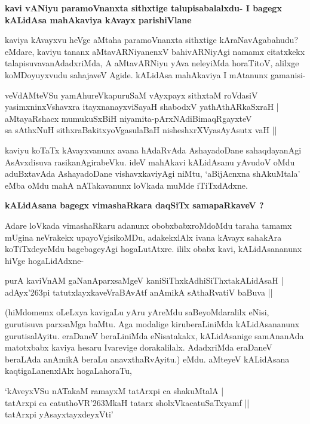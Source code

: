 \newpage
{\noindent
{\large\bf kavi vANiyu paramoVnanxta sithxtige talupisabalalxdu- I bagegx kALidAsa mahAkaviya kAvayx parishiVlane}}\label{page232}
\medskip

\noindent
kaviya kAvayxvu heVge aMtaha paramoVnanxta sithxtige kAraNavAgabahudu? eMdare, kaviyu tananx aMtavARNiyanenxV bahivARNiyAgi namamx citatxkekx talapisuvavanAdadxriMda, A aMtavARNiyu yAva neleyiMda horaTitoV, alilxge koMDoyuyxvudu sahajaveV Agide. kALidAsa mahAkaviya I mAtanunx gamanisi-

\begin{shloka}
veVdAMteVSu yamAhureVkapuruSaM vAyxpayx sithxtaM roVdasiV\\\label{232}
yasimxninxVshavxra itayxnanayxviSayaH shabodxV yathAthARkaSxraH |\\
aMtayaRshacx mumukuSxBiH niyamita-pArxNAdiBimaqRgayxteV \\
sa sAthxNuH sithxraBakitxyoVgasulaBaH nisheshxrXVyasAyAsutx vaH ||
\end{shloka}

kaviyu koTaTx kAvayxvanunx avana hAdaRvAda AshayadoDane sahaqdayanAgi AsAvxdisuva rasikanAgirabeVku. ideV mahAkavi kALidAsanu yAvudoV oMdu aduBxtavAda AshayadoDane vishavxkaviyAgi niMtu, `aBijAcnxna shAkuMtala' eMba oMdu mahA nATakavanunx loVkada muMde iTiTxdAdxne.

{\bigskip
\noindent
{\large\bf kALidAsana bagegx vimashaRkara daqSiTx samapaRkaveV ?}}
\medskip

\noindent
Adare loVkada vimashaRkaru adanunx obobxbabxroMdoMdu taraha tamamx mUgina neVrakekx upayoVgisikoMDu, adakekxlAlx ivana kAvayx sahakAra koTiTxdeyeMdu bagebageyAgi hogaLutAtxre. ililx obabx kavi, kALidAsananunx hiVge hogaLidAdxne-

\begin{shloka}
purA kaviVnAM gaNanAparxsaMgeV kaniSiThxkAdhiSiThxtakALidAsaH |\\\label{233}
adAyx\char'263pi tatutxlayxkaveVraBAvAtf anAmikA sAthaRvatiV baBuva ||
\end{shloka}

\noindent
(hiMdomemx oLeLxya kavigaLu yAru yAreMdu saBeyoMdaralilx eNisi, gurutisuva parxsaMga baMtu. Aga modalige kiruberaLiniMda kALidAsananunx gurutisalAyitu. eraDaneV beraLiniMda eNisatakakx, kALidAsanige samAnanAda matotxbabx kaviya hesaru Ivarevige dorakalilalx. AdadxriMda eraDaneV beraLAda anAmikA beraLu anavxthaRvAyitu.) eMdu. aMteyeV kALidAsana kaqtigaLanenxlAlx hogaLahoraTu,

\begin{shloka}
`kAveyxVSu nATakaM ramayxM tatArxpi ca shakuMtalA |\\\label{233a}
tatArxpi ca catuthoVR\char'263MkaH tatarx sholxVkacatuSaTxyamf ||\\
tatArxpi yAsayxtayxdeyxVti'
\end{shloka}

